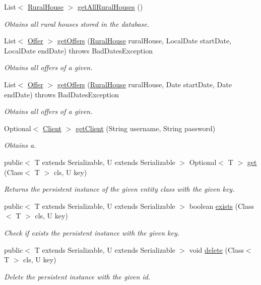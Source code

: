 \begin{DoxyCompactItemize}
List$<$ \mbox{\hyperlink{a00188}{Rural\+House}} $>$ \mbox{\hyperlink{a00148_a1cdfce6d8d91e481887b364000fbf6d0}{get\+All\+Rural\+Houses}} ()
\begin{DoxyCompactList}\small\item\em Obtains all rural houses stored in the database. \end{DoxyCompactList}\item 
List$<$ \mbox{\hyperlink{a00184}{Offer}} $>$ \mbox{\hyperlink{a00148_a731ab9e6ef26732d453046c9630c677b}{get\+Offers}} (\mbox{\hyperlink{a00188}{Rural\+House}} rural\+House, Local\+Date start\+Date, Local\+Date end\+Date)  throws Bad\+Dates\+Exception
\begin{DoxyCompactList}\small\item\em Obtains all offers of a given. \end{DoxyCompactList}\item 
List$<$ \mbox{\hyperlink{a00184}{Offer}} $>$ \mbox{\hyperlink{a00148_a2cc9a4e0968b6fde1773f03f3d1ea33c}{get\+Offers}} (\mbox{\hyperlink{a00188}{Rural\+House}} rural\+House, Date start\+Date, Date end\+Date)  throws Bad\+Dates\+Exception
\begin{DoxyCompactList}\small\item\em Obtains all offers of a given. \end{DoxyCompactList}\item 
Optional$<$ \mbox{\hyperlink{a00164}{Client}} $>$ \mbox{\hyperlink{a00148_abf581529aefd317dffd1d2ca0906c3ac}{get\+Client}} (String username, String password)
\begin{DoxyCompactList}\small\item\em Obtains a. \end{DoxyCompactList}\item 
public$<$ T extends Serializable, U extends Serializable $>$ Optional$<$ T $>$ \mbox{\hyperlink{a00148_a59446f9ebfa6acfa2315debdca84d360}{get}} (Class$<$ T $>$ cls, U key)
\begin{DoxyCompactList}\small\item\em Returns the persistent instance of the given entity class with the given key. \end{DoxyCompactList}\item 
public$<$ T extends Serializable, U extends Serializable $>$ boolean \mbox{\hyperlink{a00148_ac4fef50cac8142bfd12685d7fe48d926}{exists}} (Class$<$ T $>$ cls, U key)
\begin{DoxyCompactList}\small\item\em Check if exists the persistent instance with the given key. \end{DoxyCompactList}\item 
public$<$ T extends Serializable, U extends Serializable $>$ void \mbox{\hyperlink{a00148_a887957b637255d48878d157ee414027a}{delete}} (Class$<$ T $>$ cls, U key)
\begin{DoxyCompactList}\small\item\em Delete the persistent instance with the given id. \end{DoxyCompactList}\end{DoxyCompactItemize}


